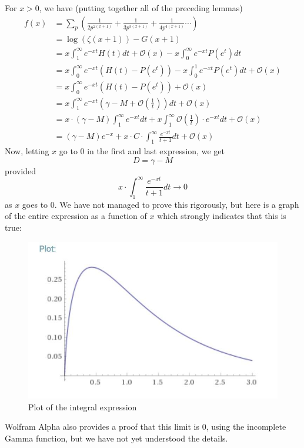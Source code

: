 \documentclass{article}
\theoremstyle{definition}
\theoremstyle{remark}
\begin{document}
For $x>0$, we have (putting together all of the preceding lemmas)
\begin{equation}
\begin{split}
f(x) & =\sum_p\left(\frac{1}{2p^{2(x+1)}}+\frac{1}{3p^{3(x+1)}}+\frac{1}{4p^{4(x+1)}}\cdots \right) \\
& = \log(\zeta(x+1))-G(x+1) \\
& =x \int_1^{\infty} e^{-xt}H(t)dt+ \mathcal{O}(x)-x\int_0^{\infty}e^{-xt}P(e^t)dt \\
& =x \int_0^{\infty}e^{-xt}(H(t)-P(e^t))-x\int_0^{1}e^{-xt}P(e^t)dt+\mathcal{O}(x) \\
& =x \int_0^{\infty}e^{-xt}(H(t)-P(e^t))+\mathcal{O}(x) \\
& = x \int_1^{\infty}e^{-xt}\left(\gamma-M+\mathcal{O}\left(\frac{1}{t}\right)\right)dt + \mathcal{O}(x) \\
& = x \cdot (\gamma-M)\int_1^{\infty}e^{-xt}dt+x\int_1^{\infty}\mathcal{O}\left(\frac{1}{t}\right)\cdot e^{-xt}dt + \mathcal{O}(x) \\
& = (\gamma-M)e^{-x}+x\cdot C\cdot \int_1^{\infty}\frac{e^{-xt}}{t+1}dt+\mathcal{O}(x)
\end{split}
\end{equation}
Now, letting $x$ go to $0$ in the first and last expression, we get
$$D=\gamma-M$$
provided
$$x\cdot \int_1^{\infty}\frac{e^{-xt}}{t+1}dt \rightarrow 0$$
as $x$ goes to $0$.
We have not managed to prove this rigorously, but here is a graph of the entire expression as a function of $x$ which strongly indicates that this is true:
\begin{figure}[H]
\centering\includegraphics[width = 0.7 \textwidth]{PlotOfIntegral.jpg}
\caption{\label{fig: PlotOfIntegral} Plot of the integral expression}
\end{figure}
Wolfram Alpha also provides a proof that this limit is $0$, using the incomplete Gamma function, but we have not yet understood the details.
\end{document}
